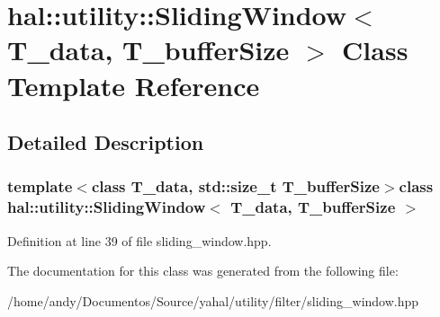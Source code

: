 \hypertarget{classhal_1_1utility_1_1_sliding_window}{}\section{hal\+:\+:utility\+:\+:Sliding\+Window$<$ T\+\_\+data, T\+\_\+buffer\+Size $>$ Class Template Reference}
\label{classhal_1_1utility_1_1_sliding_window}


\subsection{Detailed Description}
\subsubsection*{template$<$class T\+\_\+data, std\+::size\+\_\+t T\+\_\+buffer\+Size$>$class hal\+::utility\+::\+Sliding\+Window$<$ T\+\_\+data, T\+\_\+buffer\+Size $>$}



Definition at line 39 of file sliding\+\_\+window.\+hpp.



The documentation for this class was generated from the following file\+:\begin{DoxyCompactItemize}
\item 
/home/andy/\+Documentos/\+Source/yahal/utility/filter/sliding\+\_\+window.\+hpp\end{DoxyCompactItemize}
